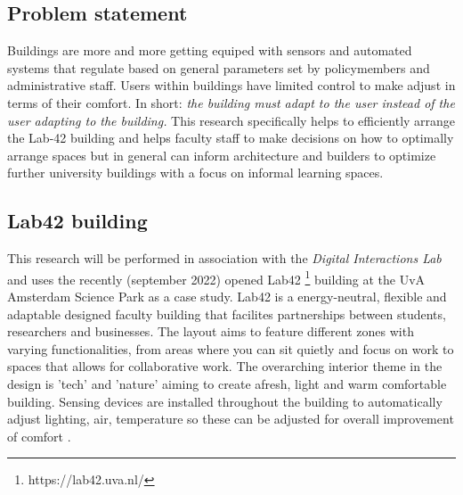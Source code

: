\subsection{Problem statement}

Buildings are more and more getting equiped with sensors and automated systems that regulate based on general parameters set by policymembers and administrative staff. Users within buildings have limited control to make adjust in terms of their comfort. In short: \emph{the building must adapt to the user instead of the user adapting to the building.} This research specifically helps to efficiently arrange the Lab-42 building and helps faculty staff to make decisions on how to optimally arrange spaces but in general can inform architecture and builders to optimize further university buildings with a focus on informal learning spaces.

\subsection{Lab42 building}

This research will be performed in association with the \emph{Digital Interactions Lab} and uses the recently (september 2022) opened Lab42 \footnote{https://lab42.uva.nl/} building at the UvA Amsterdam Science Park as a case study. Lab42 is a energy-neutral, flexible and adaptable designed faculty building that facilites partnerships between students, researchers and businesses. \cite{crouwel} The layout aims to feature different zones with varying functionalities, from areas where you can sit quietly and focus on work to spaces that allows for collaborative work. The overarching interior theme in the design is 'tech' and 'nature' aiming to create afresh, light and warm comfortable building. Sensing devices are installed throughout the building to automatically adjust lighting, air, temperature so these can be adjusted for overall improvement of comfort \cite{faculty}.